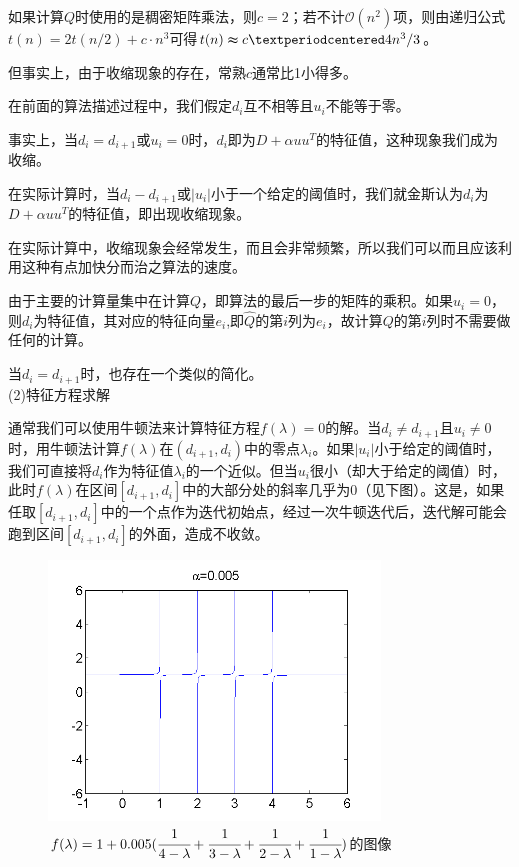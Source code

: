 \documentclass[12pt,a4paper]{article}
\begin{document}
如果计算$Q$时使用的是稠密矩阵乘法，则$c=2$；若不计$\mathcal{O} (n^2)$项，则由递归公式$t(n)=2t(n/2)+c·n^3$可得$t(n)\thickapprox c·4n^3/3$。

但事实上，由于收缩现象的存在，常熟$c$通常比1小得多。

在前面的算法描述过程中，我们假定$d_i$互不相等且$u_i$不能等于零。

事实上，当$d_i=d_{i+1}$或$u_i=0$时，$d_i$即为$D+\alpha uu^T$的特征值，这种现象我们成为收缩。

在实际计算时，当$d_i-d_{i+1}$或$|u_i|$小于一个给定的阈值时，我们就金斯认为$d_i$为$D+\alpha uu^T$的特征值，即出现收缩现象。

在实际计算中，收缩现象会经常发生，而且会非常频繁，所以我们可以而且应该利用这种有点加快分而治之算法的速度。

由于主要的计算量集中在计算$Q$，即算法的最后一步的矩阵的乘积。如果$u_i=0$，则$d_i$为特征值，其对应的特征向量$e_i$,即$\hat{Q}$的第$i$列为$e_i$，故计算$Q$的第$i$列时不需要做任何的计算。

当$d_i=d_{i+1}$时，也存在一个类似的简化。\\
(2)特征方程求解

通常我们可以使用牛顿法来计算特征方程$f(\lambda)=0$的解。当$d_i\neq d_{i+1}$且$u_i\neq 0$时，用牛顿法计算$f(\lambda)$在$(d_{i+1},d_i)$中的零点$\lambda _i$。如果$|u_i|$小于给定的阈值时，我们可直接将$d_i$作为特征值$\lambda _i$的一个近似。但当$u_i$很小（却大于给定的阈值）时，此时$f(\lambda)$在区间$[d_{i+1},d_i]$中的大部分处的斜率几乎为0（见下图）。这是，如果任取$[d_{i+1},d_i]$中的一个点作为迭代初始点，经过一次牛顿迭代后，迭代解可能会跑到区间$[d_{i+1},d_i]$的外面，造成不收敛。
\begin{figure}[H]
	\centering
	\includegraphics[scale=1]{./figures/figure_3.png}
	\caption{$f(\lambda)=1+0.005(\cfrac{1}{4-\lambda}+\cfrac{1}{3-\lambda}+\cfrac{1}{2-\lambda}+\cfrac{1}{1-\lambda})$的图像}
\end{figure}
\end{document}
